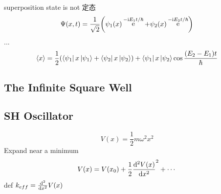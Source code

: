 \documentclass[UTF8]{ctexart} %
\DeclareMathOperator{\e}{\mathrm{e}}
\renewcommand{\I}{\mathrm{i}}
\numberwithin{equation}{subsection}
\begin{document}
superposition state is not 定态
\begin{equation}\label{key}
\Psi(x,t) = \dfrac{1}{\sqrt{2}}\qty(\psi_1(x)\e^{-\I E_1 t/\hbar} + \psi_2(x)\e^{-\I E_2 t/\hbar})
\end{equation}
...
\begin{equation}\label{key}
\langle x\rangle = \dfrac{1}{2}\qty(\bra{\psi_1}x\ket{\psi_1} + \bra{\psi_2}x\ket{\psi_2}) + \bra{\psi_1}x\ket{\psi_2}\cos\dfrac{(E_2 - E_1)t}{\hbar}
\end{equation}

\subsection{The Infinite Square Well}

\subsection{SH Oscillator}
\begin{equation}\label{key}
V(x) = \dfrac{1}{2}m\omega^2 x^2
\end{equation}
Expand near a minimum
\begin{equation}\label{key}
V(x) = V(x_0) + \dfrac{1}{2}\dv[2]{V(x)}{x} (x - x_0)^2 + \cdots
\end{equation}
def $ k_{eff} = \dv[2]{x}V(x)$
\end{document}
